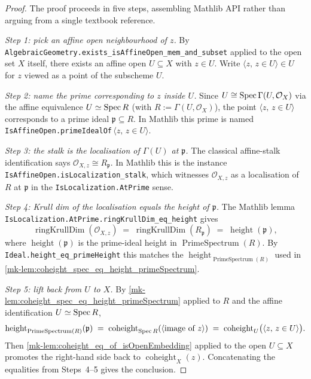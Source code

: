 \begin{proof}
  \leanok

  The proof proceeds in five steps, assembling Mathlib API rather than
  arguing from a single textbook reference.

  \emph{Step 1: pick an affine open neighbourhood of \(z\).} By
  \texttt{AlgebraicGeometry.exists\_isAffineOpen\_mem\_and\_subset}
  applied to the open set \(X\) itself, there exists an affine open
  \(U \subseteq X\) with \(z \in U\). Write \(\langle z, \, z \in U \rangle \in U\)
  for \(z\) viewed as a point of the subscheme \(U\).

  \emph{Step 2: name the prime corresponding to \(z\) inside \(U\).} Since
  \(U \cong \operatorname{Spec} \Gamma(U, \mathcal{O}_X)\) via the affine equivalence
  \(U \simeq \operatorname{Spec} R\) (with \(R := \Gamma(U, \mathcal{O}_X)\)), the point
  \(\langle z, \, z \in U\rangle\) corresponds to a prime ideal \(\mathfrak{p}
  \subseteq R\). In Mathlib this prime is named
  \texttt{IsAffineOpen.primeIdealOf}\,\(\langle z, \, z \in U\rangle\).

  \emph{Step 3: the stalk is the localisation of \(\Gamma(U)\) at
  \(\mathfrak{p}\).} The classical affine-stalk identification says
  \(\mathcal{O}_{X,z} \cong R_{\mathfrak{p}}\). In Mathlib this is the
  instance \texttt{IsAffineOpen.isLocalization\_stalk}, which witnesses
  \(\mathcal{O}_{X,z}\) as a localisation of \(R\) at \(\mathfrak{p}\) in the
  \texttt{IsLocalization.AtPrime} sense.

  \emph{Step 4: Krull dim of the localisation equals the height of
  \(\mathfrak{p}\).} The Mathlib lemma
  \texttt{IsLocalization.AtPrime.ringKrullDim\_eq\_height} gives
  \[
    \operatorname{ringKrullDim}(\mathcal{O}_{X,z}) \;=\;
    \operatorname{ringKrullDim}(R_{\mathfrak{p}}) \;=\;
    \operatorname{height}(\mathfrak{p}),
  \]
  where \(\operatorname{height}(\mathfrak{p})\) is the prime-ideal height in
  \(\operatorname{PrimeSpectrum}(R)\). By
  \texttt{Ideal.height\_eq\_primeHeight} this matches the
  \(\operatorname{height}_{\operatorname{PrimeSpectrum}(R)}\) used in
  \ref{mk-lem:coheight_spec_eq_height_primeSpectrum}.

  \emph{Step 5: lift back from \(U\) to \(X\).} By
  \ref{mk-lem:coheight_spec_eq_height_primeSpectrum} applied to \(R\) and the
  affine identification \(U \simeq \operatorname{Spec} R\),
  \[
    \operatorname{height}_{\operatorname{PrimeSpectrum}(R)}(\mathfrak{p}) \;=\;
    \operatorname{coheight}_{\operatorname{Spec} R}(\langle\text{image of } z\rangle) \;=\;
    \operatorname{coheight}_{U}\bigl(\langle z, \, z \in U\rangle\bigr).
  \]
  Then \ref{mk-lem:coheight_eq_of_isOpenEmbedding} applied to the open
  \(U \subseteq X\) promotes the right-hand side back to
  \(\operatorname{coheight}_{X}(z)\). Concatenating the equalities from
  Steps~4--5 gives the conclusion.
\end{proof}

